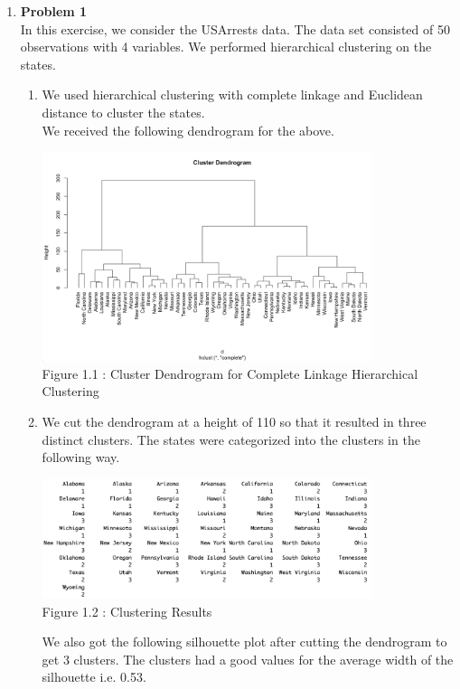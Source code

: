 \documentclass[11pt]{article}
\begin{document}
\begin{enumerate}
\item \textbf{Problem 1}
\\
In this exercise, we consider the USArrests data. The data set consisted of 50 observations with 4 variables. We performed hierarchical clustering on the states.
\begin{enumerate}
    \item We used hierarchical clustering with complete linkage and Euclidean distance to cluster the states.
    \\We received the following dendrogram for the above.
    \begin{center}
    \includegraphics[width=0.8\textwidth]{1_A.png}
    \\\footnotesize Figure 1.1 : Cluster Dendrogram for Complete Linkage Hierarchical Clustering
    \end{center}
    \item We cut the dendrogram at a height of 110 so that it resulted in three distinct clusters. The states were categorized into the clusters in the following way.
    
    \begin{center}
    \includegraphics[width=0.8\textwidth]{1_B.png}
    \\\footnotesize Figure 1.2 : Clustering Results
    \end{center}
    
    We also got the following silhouette plot after cutting the dendrogram to get 3 clusters. The clusters had a good values for the average width of the silhouette i.e. 0.53.
    

\end{enumerate}
\end{enumerate}
\end{document}
